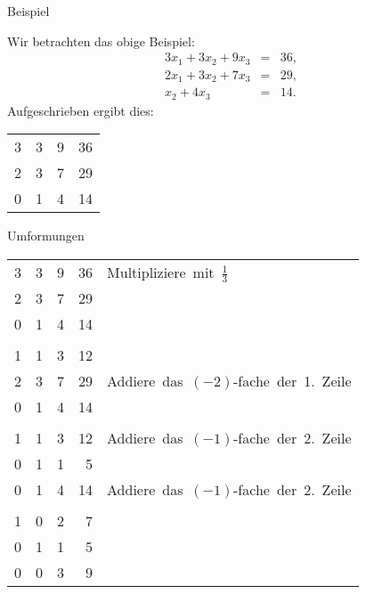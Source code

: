 \documentclass[german]{beamer}
\newcommand{\bq}{\begin{eqnarray*}}
\newcommand{\eq}{\end{eqnarray*}}
\begin{document}
\begin{frame}{Beispiel}

Wir betrachten das obige Beispiel:
\bq
 3 x_1 + 3 x_2 + 9 x_3 & = & 36,
 \nonumber \\
 2 x_1 + 3 x_2 + 7 x_3 & = & 29,
 \nonumber \\
 x_2 + 4 x_3 & = & 14.
\eq
Aufgeschrieben ergibt dies:
\begin{center}
\begin{tabular}{rrr|r}
 3 &  3 &  9 & 36 \\
 2 &  3 &  7 & 29 \\
 0 &  1 &  4 & 14 \\
\end{tabular}
\end{center}

\end{frame}

\begin{frame}{Umformungen}

\begin{center}
\begin{tabular}{rrr|rl}
 3 &  3 &  9 & 36 & \mbox{Multipliziere mit $\frac{1}{3}$} \\
 2 &  3 &  7 & 29 & \\
 0 &  1 &  4 & 14&  \\
 & & & & \\
 1 &  1 &  3 & 12 & \\
 2 &  3 &  7 & 29 & \mbox{Addiere das $(-2)$-fache der 1. Zeile} \\
 0 &  1 &  4 & 14 & \\
 & & & & \\
 1 &  1 &  3 & 12 & \mbox{Addiere das $(-1)$-fache der 2. Zeile} \\
 0 &  1 &  1 & 5 & \\
 0 &  1 &  4 & 14 & \mbox{Addiere das $(-1)$-fache der 2. Zeile} \\
 & & & & \\
 1 &  0 &  2 & 7 & \\
 0 &  1 &  1 & 5 & \\
 0 &  0 &  3 & 9 & \\
\end{tabular}
\end{center}

\end{frame}
\end{document}
